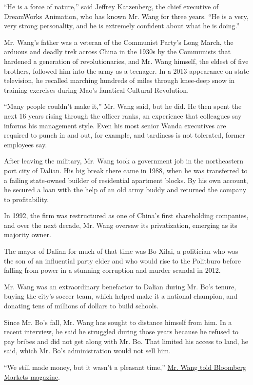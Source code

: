 ``He is a force of nature,'' said Jeffrey Katzenberg, the chief
executive of DreamWorks Animation, who has known Mr. Wang for three
years. ``He is a very, very strong personality, and he is extremely
confident about what he is doing.''

Mr. Wang's father was a veteran of the Communist Party's Long March, the
arduous and deadly trek across China in the 1930s by the Communists that
hardened a generation of revolutionaries, and Mr. Wang himself, the
eldest of five brothers, followed him into the army as a teenager. In a
2013 appearance on state television, he recalled marching hundreds of
miles through knee-deep snow in training exercises during Mao's
fanatical Cultural Revolution.

``Many people couldn't make it,'' Mr. Wang said, but he did. He then
spent the next 16 years rising through the officer ranks, an experience
that colleagues say informs his management style. Even his most senior
Wanda executives are required to punch in and out, for example, and
tardiness is not tolerated, former employees say.

After leaving the military, Mr. Wang took a government job in the
northeastern port city of Dalian. His big break there came in 1988, when
he was transferred to a failing state-owned builder of residential
apartment blocks. By his own account, he secured a loan with the help of
an old army buddy and returned the company to profitability.

In 1992, the firm was restructured as one of China's first shareholding
companies, and over the next decade, Mr. Wang oversaw its privatization,
emerging as its majority owner.

The mayor of Dalian for much of that time was Bo Xilai, a politician who
was the son of an influential party elder and who would rise to the
Politburo before falling from power in a stunning corruption and murder
scandal in 2012.

Mr. Wang was an extraordinary benefactor to Dalian during Mr. Bo's
tenure, buying the city's soccer team, which helped make it a national
champion, and donating tens of millions of dollars to build schools.

Since Mr. Bo's fall, Mr. Wang has sought to distance himself from him.
In a recent interview, he said he struggled during those years because
he refused to pay bribes and did not get along with Mr. Bo. That limited
his access to land, he said, which Mr. Bo's administration would not
sell him.

``We still made money, but it wasn't a pleasant time,''
\href{http://www.bloomberg.com/news/articles/2015-02-09/wang-boy-soldier-turned-billionaire-pursues-hollywood-studios}{Mr.
Wang told Bloomberg Markets magazine}.

